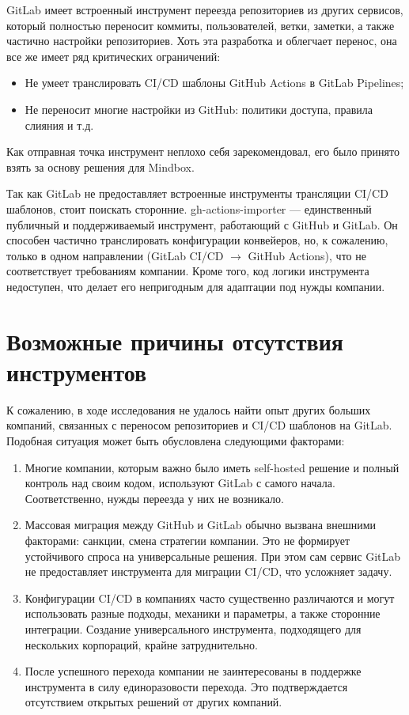 GitLab имеет встроенный инструмент переезда репозиториев из других сервисов,
который полностью переносит коммиты, пользователей, ветки, заметки, а также частично настройки репозиториев.
Хоть эта разработка и облегчает перенос, она все же имеет ряд критических ограничений:
\begin{itemize}
  \item Не умеет транслировать CI/CD шаблоны GitHub Actions в GitLab Pipelines;
  \item Не переносит многие настройки из GitHub: политики доступа, правила слияния и т.д.
\end{itemize}
Как отправная точка инструмент неплохо себя зарекомендовал, его было принято взять за основу решения для Mindbox.

Так как GitLab не предоставляет встроенные инструменты трансляции CI/CD шаблонов, стоит поискать сторонние.
gh-actions-importer \cite{gh-actions-migrator} — единственный публичный и поддерживаемый инструмент, работающий с GitHub и GitLab.
Он способен частично транслировать конфигурации конвейеров, но, к сожалению, только в одном направлении (GitLab CI/CD $\rightarrow$ GitHub Actions),
что не соответствует требованиям компании.
Кроме того, код логики инструмента недоступен, что делает его непригодным для адаптации под нужды компании.

\section{Возможные причины отсутствия инструментов} \label{sec:instrument-absence}
К сожалению, в ходе исследования не удалось найти опыт других больших компаний, связанных с переносом репозиториев и CI/CD шаблонов на GitLab.
Подобная ситуация может быть обусловлена следующими факторами:
\begin{enumerate}
  \item Многие компании, которым важно было иметь self-hosted решение и полный контроль над своим кодом, используют GitLab с самого начала.
        Соответственно, нужды переезда у них не возникало.

  \item Массовая миграция между GitHub и GitLab обычно вызвана внешними факторами: санкции, смена стратегии компании.
        Это не формирует устойчивого спроса на универсальные решения.
        При этом сам сервис GitLab не предоставляет инструмента для миграции CI/CD, что усложняет задачу.

  \item Конфигурации CI/CD в компаниях часто существенно различаются и могут использовать разные подходы,
        механики и параметры, а также сторонние интеграции.
        Создание универсального инструмента, подходящего для нескольких корпораций, крайне затруднительно.

  \item После успешного перехода компании не заинтересованы в поддержке инструмента в силу единоразовости перехода.
        Это подтверждается отсутствием открытых решений от других компаний.
\end{enumerate}
